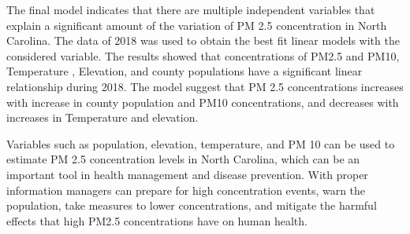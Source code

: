 \documentclass[12pt,]{article}
\begin{document}
The final model indicates that there are multiple independent variables
that explain a significant amount of the variation of PM 2.5
concentration in North Carolina. The data of 2018 was used to obtain the
best fit linear models with the considered variable. The results showed
that concentrations of PM2.5 and PM10, Temperature , Elevation, and
county populations have a significant linear relationship during 2018.
The model suggest that PM 2.5 concentrations increases with increase in
county population and PM10 concentrations, and decreases with increases
in Temperature and elevation.

Variables such as population, elevation, temperature, and PM 10 can be
used to estimate PM 2.5 concentration levels in North Carolina, which
can be an important tool in health management and disease prevention.
With proper information managers can prepare for high concentration
events, warn the population, take measures to lower concentrations, and
mitigate the harmful effects that high PM2.5 concentrations have on
human health.
\end{document}
